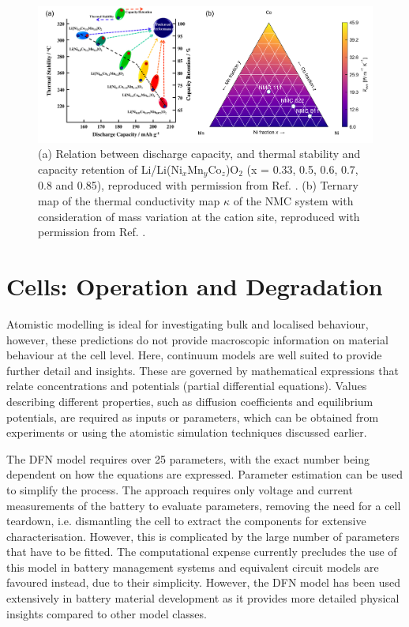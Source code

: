 \documentclass[journal=jacsat,manuscript=article]{achemso}
\begin{document}
\begin{figure}[]
  \centering
    \includegraphics[width=13cm]{Figures/P_thermal.png}
    \caption{(a) Relation between discharge capacity, and thermal stability and capacity retention of Li/Li(Ni$_x$Mn$_y$Co$_z$)O$_2$ (x = 0.33, 0.5, 0.6, 0.7, 0.8 and 0.85), reproduced with permission from Ref. . (b) Ternary map of the thermal conductivity map $\kappa$ of the NMC system with consideration of mass variation at the cation site, reproduced with permission from Ref. .}
  \label{figure_thermal}
\end{figure}

\section*{Cells: Operation and Degradation}
Atomistic modelling is ideal for investigating bulk and localised behaviour, however, these predictions do not provide macroscopic information on material behaviour at the cell level. 
Here, continuum models are well suited to provide further detail and insights. 
These are governed by mathematical expressions that relate concentrations and potentials (partial differential equations). 
Values describing different properties, such as diffusion coefficients and equilibrium potentials, are required as inputs or parameters, which can be obtained from experiments or using the atomistic simulation techniques discussed earlier.

The DFN model requires over 25 parameters, with the exact number being dependent on how the equations are expressed.\cite{Kim2011} 
Parameter estimation can be used to simplify the process. 
The approach requires only voltage and current measurements of the battery to evaluate parameters, removing the need for a cell teardown, i.e. dismantling the cell to extract the components for extensive characterisation.\cite{Jin2018} 
However, this is complicated by the large number of parameters that have to be fitted.
The computational expense currently precludes the use of this model in battery management systems and equivalent circuit models are favoured instead, due to their simplicity.\cite{Marquis2019} 
However, the DFN model has been used extensively in battery material development as it provides more detailed physical insights compared to other model classes.\cite{Krewer_2018}
\end{document}
